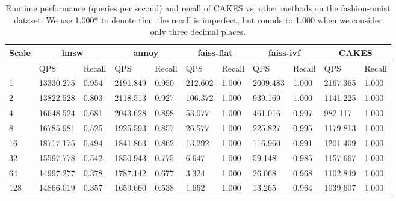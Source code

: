 \begin{table}[!t]
    \caption{Runtime performance (queries per second) and recall of CAKES vs. other methods on the fashion-mnist dataset. We use 1.000* to denote that the recall is imperfect, but rounds to 1.000 when we consider only three decimal places.}
    \label{table:results:ann-fashion}
    \vskip 0.15in
    \begin{center}
        \begin{small}
            \begin{sc}
                \begin{tabular}{|l|p{1cm}|p{1cm}|p{1cm}|p{1cm}|p{1cm}|p{1cm}|p{1cm}|p{1cm}|p{1cm}|p{1cm}|}
                    \hline
                    \textbf{Scale}  & \multicolumn{2}{|c|}{\textbf{hnsw}} & \multicolumn{2}{|c|}{\textbf{annoy}} & \multicolumn{2}{|c|}{\textbf{faiss-flat}} & \multicolumn{2}{|c|}{\textbf{faiss-ivf}}  & \multicolumn{2}{|c|}{\textbf{CAKES}} \\
                    \hline
                    &             QPS & Recall        & QPS & Recall      & QPS & Recall       & QPS & Recall     & QPS & Recall    \\
                    \hline
                    1 & 13330.275 & 0.954 & 2191.849 & 0.950 & 212.602 & 1.000 & 2009.483 & 1.000 & 2167.365 & 1.000 \\
                    \hline
                    2 & 13822.528 & 0.803 & 2118.513 & 0.927 & 106.372 & 1.000 & 939.169 & 1.000 & 1141.225 & 1.000 \\
                    \hline
                    4 & 16648.524 & 0.681 & 2043.628 & 0.898 & 53.077 & 1.000 & 461.016 & 0.997 & 982.117 & 1.000 \\
                    \hline
                    8 & 16785.981 & 0.525 & 1925.593 & 0.857 & 26.577 & 1.000 & 225.827 & 0.995 & 1179.813 & 1.000 \\
                    \hline
                    16 & 18717.175 & 0.494 & 1841.863 & 0.862 & 13.292 & 1.000 & 116.960 & 0.991 & 1201.409 & 1.000 \\
                    \hline
                    32 & 15597.778 & 0.542 & 1850.943 & 0.775 & 6.647 & 1.000 & 59.148 & 0.985 & 1157.667 & 1.000 \\
                    \hline
                    64 & 14997.277 & 0.378 & 1787.142 & 0.677 & 3.324 & 1.000 & 26.068 & 0.968 & 1102.849 & 1.000 \\
                    \hline
                    128 & 14866.019 & 0.357 & 1659.660 & 0.538 & 1.662 & 1.000 & 13.265 & 0.964 & 1039.607 & 1.000 \\

\end{tabular}
\end{sc}
\end{small}
\end{center}
\end{table}
